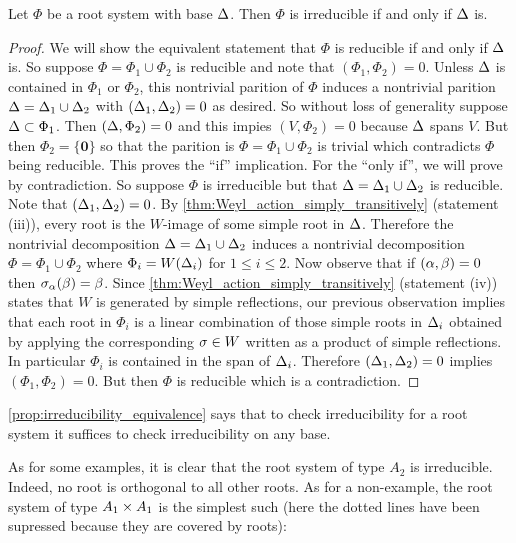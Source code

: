 \documentclass[12pt,reqno,oneside]{amsart}
\begin{document}
    \begin{proposition}\label{prop:irreducibility_equivalence}
        Let $\Phi$ be a root system with base $\Delta$. Then $\Phi$ is irreducible if and only if $\Delta$ is.
    \end{proposition}
    \begin{proof}
        We will show the equivalent statement that $\Phi$ is reducible if and only if $\Delta$ is. So suppose $\Phi = \Phi_{1} \cup \Phi_{2}$ is reducible and note that $(\Phi_{1},\Phi_{2}) = 0$. Unless $\Delta$ is contained in $\Phi_{1}$ or $\Phi_{2}$, this nontrivial parition of $\Phi$ induces a nontrivial parition $\Delta = \Delta_{1} \cup \Delta_{2}$ with $(\Delta_{1},\Delta_{2}) = 0$ as desired. So without loss of generality suppose $\Delta \subset \Phi_{1}$. Then $(\Delta,\Phi_{2}) = 0$ and this impies $(V,\Phi_{2}) = 0$ because $\Delta$ spans $V$. But then $\Phi_{2} = \{\textbf{0}\}$ so that the parition is $\Phi = \Phi_{1} \cup \Phi_{2}$ is trivial which contradicts $\Phi$ being reducible. This proves the ``if'' implication. For the ``only if'', we will prove by contradiction. So suppose $\Phi$ is irreducible but that $\Delta = \Delta_{1} \cup \Delta_{2}$ is reducible. Note that $(\Delta_{1},\Delta_{2}) = 0$. By \cref{thm:Weyl_action_simply_transitively} (statement (iii)), every root is the $W$-image of some simple root in $\Delta$. Therefore the nontrivial decomposition $\Delta = \Delta_{1} \cup \Delta_{2}$ induces a nontrivial decomposition $\Phi = \Phi_{1} \cup \Phi_{2}$ where $\Phi_{i} = W(\Delta_{i})$ for $1 \le i \le 2$. Now observe that if $(\alpha,\beta) = 0$ then $\sigma_{\alpha}(\beta) = \beta$. Since \cref{thm:Weyl_action_simply_transitively} (statement (iv)) states that $W$ is generated by simple reflections, our previous observation implies that each root in $\Phi_{i}$ is a linear combination of those simple roots in $\Delta_{i}$ obtained by applying the corresponding $\sigma \in W$ written as a product of simple reflections. In particular $\Phi_{i}$ is contained in the span of $\Delta_{i}$. Therefore $(\Delta_{1},\Delta_{2}) = 0$ implies $(\Phi_{1},\Phi_{2}) = 0$. But then $\Phi$ is reducible which is a contradiction.
    \end{proof}

    \cref{prop:irreducibility_equivalence} says that to check irreducibility for a root system it suffices to check irreducibility on any base.

    As for some examples, it is clear that the root system of type $A_{2}$ is irreducible. Indeed, no root is orthogonal to all other roots. As for a non-example, the root system of type $A_{1} \times A_{1}$ is the simplest such (here the dotted lines have been supressed because they are covered by roots):
\end{document}

